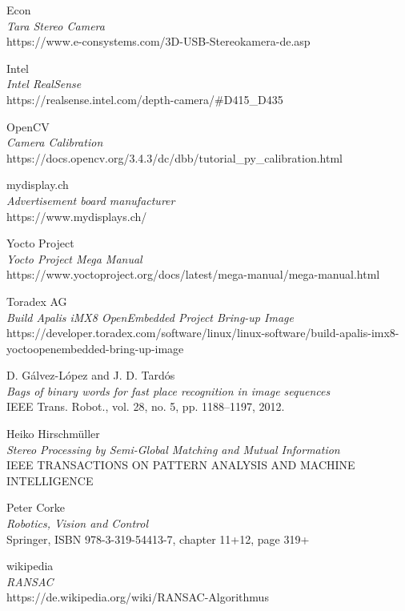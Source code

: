 \documentclass[11pt,a4paper,titlepage,oneside]{report}
\begin{document}
\begin{thebibliography}{1}
	Econ\\
	\textit{Tara Stereo Camera}\\
	https://www.e-consystems.com/3D-USB-Stereokamera-de.asp

	Intel\\
	\textit{Intel RealSense}\\
	https://realsense.intel.com/depth-camera/\#D415\_D435


	OpenCV\\
	\textit{Camera Calibration}\\
	https://docs.opencv.org/3.4.3/dc/dbb/tutorial\_py\_calibration.html

	mydisplay.ch\\
	\textit{Advertisement board manufacturer}\\
	https://www.mydisplays.ch/

	Yocto Project\\
	\textit{Yocto Project Mega Manual}\\
	https://www.yoctoproject.org/docs/latest/mega-manual/mega-manual.html

	Toradex AG\\
	\textit{Build Apalis iMX8 OpenEmbedded Project Bring-up Image}\\
	https://developer.toradex.com/software/linux/linux-software/build-apalis-imx8-yoctoopenembedded-bring-up-image

	D. Gálvez-López and J. D. Tardós\\
	\textit{Bags of binary words for fast place recognition in image sequences}\\
	IEEE Trans. Robot., vol. 28, no. 5, pp. 1188–1197, 2012.

	Heiko Hirschmüller\\
	\textit{ Stereo Processing by Semi-Global Matching and Mutual Information}\\
	IEEE TRANSACTIONS ON PATTERN ANALYSIS AND MACHINE INTELLIGENCE
	 
	Peter Corke\\
	\textit{Robotics, Vision and Control}\\
	Springer, ISBN 978-3-319-54413-7, chapter 11+12, page 319+

	wikipedia\\
	\textit{RANSAC}\\
	https://de.wikipedia.org/wiki/RANSAC-Algorithmus


\end{thebibliography}
\end{document}
